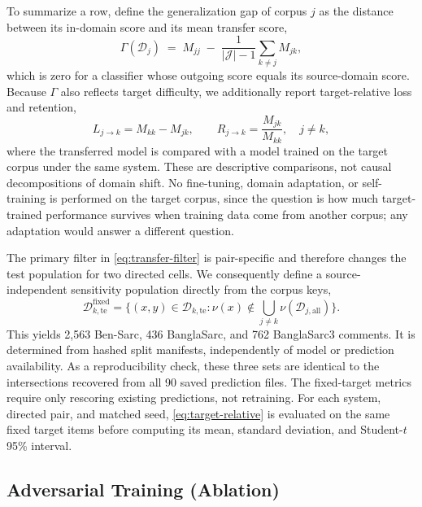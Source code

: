 \documentclass{ieeeaccess}
\begin{document}
To summarize a row, define the generalization gap of corpus $j$ as the distance between its in-domain score and its mean transfer score,
\begin{equation}
\Gamma(\mathcal{D}_j) \;=\; M_{jj} \;-\; \frac{1}{|\mathcal{J}|-1}\sum_{k\neq j} M_{jk},
\label{eq:gap}
\end{equation}
which is zero for a classifier whose outgoing score equals its source-domain score. Because $\Gamma$ also reflects target difficulty, we additionally report target-relative loss and retention,
\begin{equation}
L_{j\rightarrow k}=M_{kk}-M_{jk},\qquad
R_{j\rightarrow k}=\frac{M_{jk}}{M_{kk}},\quad j\neq k,
\label{eq:target-relative}
\end{equation}
where the transferred model is compared with a model trained on the target corpus under the same system. These are descriptive comparisons, not causal decompositions of domain shift. No fine-tuning, domain adaptation, or self-training is performed on the target corpus, since the question is how much target-trained performance survives when training data come from another corpus; any adaptation would answer a different question.

The primary filter in \cref{eq:transfer-filter} is pair-specific and therefore changes the test population for two directed cells. We consequently define a source-independent sensitivity population directly from the corpus keys,
\begin{equation}
\mathcal D^{\mathrm{fixed}}_{k,\mathrm{te}}=
\bigl\{(x,y)\in\mathcal D_{k,\mathrm{te}}:\nu(x)\notin
\bigcup_{j\ne k}\nu(\mathcal D_{j,\mathrm{all}})\bigr\}.
\label{eq:fixed-target}
\end{equation}
This yields 2{,}563 Ben-Sarc, 436 BanglaSarc, and 762 BanglaSarc3 comments. It is determined from hashed split manifests, independently of model or prediction availability. As a reproducibility check, these three sets are identical to the intersections recovered from all 90 saved prediction files. The fixed-target metrics require only rescoring existing predictions, not retraining. For each system, directed pair, and matched seed, \cref{eq:target-relative} is evaluated on the same fixed target items before computing its mean, standard deviation, and Student-$t$ 95\% interval.


\subsection{Adversarial Training (Ablation)}
\label{sec:adv-framework}
\end{document}
